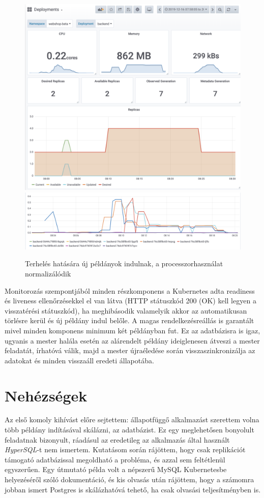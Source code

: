 \begin{figure}[!ht]
\centering
\includegraphics[width=150mm, keepaspectratio]{img/replica_up.png}
\vskip 0.5in
\vfill
\includegraphics[width=150mm, keepaspectratio]{img/hpa_cpu.png}
\caption{Terhelés hatására új példányok indulnak, a processzorhasználat normalizálódik}
\end{figure}
\clearpage
Monitorozás szempontjából minden részkomponens a Kubernetes adta readiness és liveness ellenőrzésekkel el van látva (HTTP státuszkód 200 (OK) kell legyen a visszatérési státuszkód), ha meghibásodik valamelyik akkor az automatikusan törlésre kerül és új példány indul belőle. A magas rendelkezésreállás is garantált mivel minden komponens minimum két példányban fut. Ez az adatbázisra is igaz, ugyanis a mester halála esetén az alárendelt példány ideiglenesen átveszi a mester feladatát, írhatóvá válik, majd a mester újraéledése során visszaszinkronizálja az adatokat és minden visszaáll eredeti állapotába.
\section{Nehézségek}
Az első komoly kihívást előre sejtettem: állapotfüggő alkalmazást szerettem volna több példány indításával skálázni, az adatbázist. Ez egy meglehetősen bonyolult feladatnak bizonyult, ráadásul az eredetileg az alkalmazás által használt \textit{HyperSQL}-t nem ismertem. Kutatásom során rájöttem, hogy csak replikációt támogató adatbázissal megoldható a probléma, és azzal sem feltétlenül egyszerűen. Egy útmutató példa volt a népszerű MySQL Kubernetesbe helyezéséről szóló dokumentáció\cite{db_k8s}, és kis olvasás után rájöttem, hogy a számomra jobban ismert Postgres is skálázhatóvá tehető, ha csak olvasási teljesítményben is.

